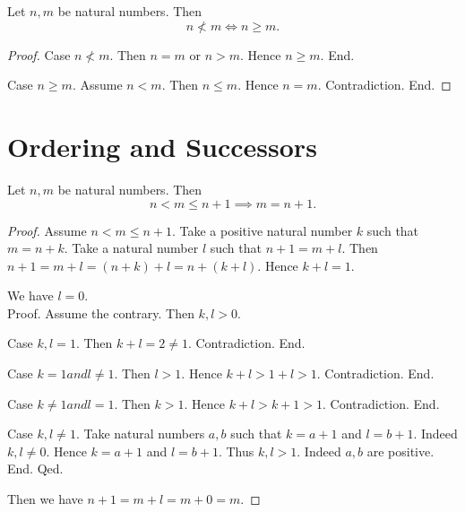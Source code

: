 \documentclass[10pt]{article}
\begin{document}
  \begin{forthel}
    \begin{proposition}
      Let $n, m$ be natural numbers.
      Then \[ n \nless m \iff n \geq m. \]
    \end{proposition}
    \begin{proof}
      Case $n \nless m$.
        Then $n = m$ or $n > m$.
        Hence $n \geq m$.
      End.

      Case $n \geq m$.
        Assume $n < m$.
        Then $n \leq m$.
        Hence $n = m$.
        Contradiction.
      End.
    \end{proof}
  \end{forthel}


  \section{Ordering and Successors}

  \begin{forthel}
    \begin{proposition}
      Let $n, m$ be natural numbers.
      Then \[ n < m \leq n + 1 \implies m = n + 1. \]
    \end{proposition}
    \begin{proof}
      Assume $n < m \leq n + 1$.
      Take a positive natural number $k$ such that $m = n + k$.
      Take a natural number $l$ such that $n + 1 = m + l$.
      Then $n + 1
        = m + l
        = (n + k) + l
        = n + (k + l)$.
      Hence $k + l = 1$.

      We have $l = 0$. \\
      Proof.
        Assume the contrary.
        Then $k,l > 0$.

        Case $k,l = 1$.
          Then $k + l
            = 2
            \neq 1$.
          Contradiction.
        End.

        Case $k = 1 and l \neq 1$.
          Then $l > 1$.
          Hence $k + l
            > 1 + l
            > 1$.
          Contradiction.
        End.

        Case $k \neq 1 and l = 1$.
          Then $k > 1$.
          Hence $k + l
            > k + 1
            > 1$.
          Contradiction.
        End.

        Case $k, l \neq 1$.
          Take natural numbers $a, b$ such that $k = a + 1$ and $l = b + 1$.
          Indeed $k, l \neq 0$.
          Hence $k = a + 1$ and $l = b + 1$.
          Thus $k, l > 1$. Indeed $a, b$ are positive.
        End.
      Qed.

      Then we have $n + 1
        = m + l
        = m + 0
        = m$.
    \end{proof}
  \end{forthel}
\end{document}
